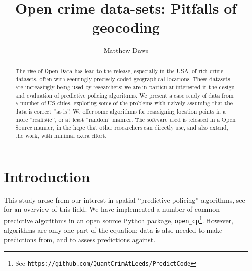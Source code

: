 \documentclass[twoside,a4paper,twocolumn,10pt]{article}
\theoremstyle{plain}
\theoremstyle{definition}
\begin{document}
\title{Open crime data-sets: Pitfalls of geocoding}
\author{Matthew Daws}
\maketitle

\begin{abstract}
The rise of Open Data has lead to the release, especially in the USA, of rich
crime datasets, often with seemingly precisely coded geographical locations.
These datasets are increasingly being used by researchers; we are in particular
interested in the design and evaluation of predictive policing algorithms.
We present a case study of data from a number of US cities, exploring some of
the problems with naively assuming that the data is correct ``as is''.  We offer
some algorithms for reassigning location points in a more ``realistic'', or at
least ``random'' manner.  The software used is released in a Open Source manner,
in the hope that other researchers can directly use, and also extend, the work,
with minimal extra effort.
\end{abstract}


\section{Introduction}

This study arose from our interest in spatial ``predictive policing'' algorithms,
see \cite{rand} for an overview of this field.  We have implemented a number of
common predictive algorithms in an open source Python package,
\texttt{open\_cp}\footnote{See \texttt{https://github.com/QuantCrimAtLeeds/PredictCode}}.
However, algorithms are only one part of the equation: data is also needed to make
predictions from, and to assess predictions against.
\end{document}
